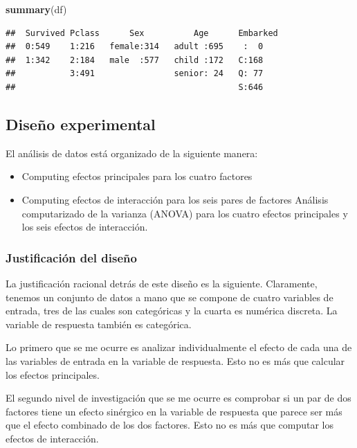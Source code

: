 \documentclass[]{article}
\newenvironment{Shaded}{\begin{snugshade}}{\end{snugshade}}
\newcommand{\KeywordTok}[1]{\textcolor[rgb]{0.13,0.29,0.53}{\textbf{#1}}}
\newcommand{\NormalTok}[1]{#1}
\providecommand{\tightlist}{%
  \setlength{\itemsep}{0pt}\setlength{\parskip}{0pt}}
\begin{document}
\begin{Shaded}
\begin{Highlighting}[]
\KeywordTok{summary}\NormalTok{(df)}
\end{Highlighting}
\end{Shaded}

\begin{verbatim}
##  Survived Pclass      Sex          Age      Embarked
##  0:549    1:216   female:314   adult :695    :  0   
##  1:342    2:184   male  :577   child :172   C:168   
##           3:491                senior: 24   Q: 77   
##                                             S:646
\end{verbatim}

\subsection{Diseño experimental}\label{diseno-experimental}

El análisis de datos está organizado de la siguiente manera:

\begin{itemize}
\tightlist
\item
  Computing efectos principales para los cuatro factores
\item
  Computing efectos de interacción para los seis pares de factores
  Análisis computarizado de la varianza (ANOVA) para los cuatro efectos
  principales y los seis efectos de interacción.
\end{itemize}

\subsubsection{Justificación del diseño}\label{justificacion-del-diseno}

La justificación racional detrás de este diseño es la siguiente.
Claramente, tenemos un conjunto de datos a mano que se compone de cuatro
variables de entrada, tres de las cuales son categóricas y la cuarta es
numérica discreta. La variable de respuesta también es categórica.

Lo primero que se me ocurre es analizar individualmente el efecto de
cada una de las variables de entrada en la variable de respuesta. Esto
no es más que calcular los efectos principales.

El segundo nivel de investigación que se me ocurre es comprobar si un
par de dos factores tiene un efecto sinérgico en la variable de
respuesta que parece ser más que el efecto combinado de los dos
factores. Esto no es más que computar los efectos de interacción.
\end{document}
